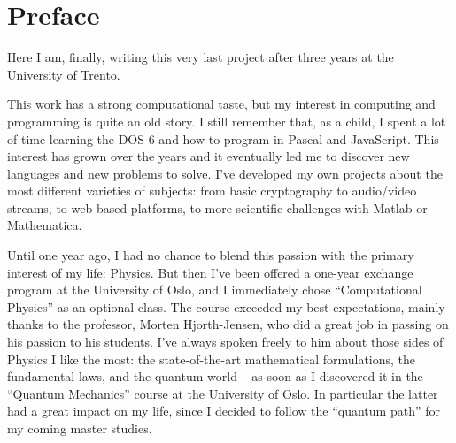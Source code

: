
\chapter{Preface}

Here I am, finally, writing this very last project after three years at the University of Trento.

This work has a strong computational taste, but my interest in computing and programming is quite an old story. I still remember that, as a child, I spent a lot of time learning the DOS 6 and how to program in Pascal and JavaScript. This interest has grown over the years and it eventually led me to discover new languages and new problems to solve. I've developed my own projects about the most different varieties of subjects: from basic cryptography to audio/video streams, to web-based platforms, to more scientific challenges with Matlab or Mathematica.

Until one year ago, I had no chance to blend this passion with the primary interest of my life: Physics. But then I've been offered a one-year exchange program at the University of Oslo, and I immediately chose ``Computational Physics'' as an optional class. The course exceeded my best expectations, mainly thanks to the professor, Morten Hjorth-Jensen, who did a great job in passing on his passion to his students. I've always spoken freely to him about those sides of Physics I like the most: the state-of-the-art mathematical formulations, the fundamental laws, and the quantum world -- as soon as I discovered it in the ``Quantum Mechanics'' course at the University of Oslo. In particular the latter had a great impact on my life, since I decided to follow the ``quantum path'' for my coming master studies.

